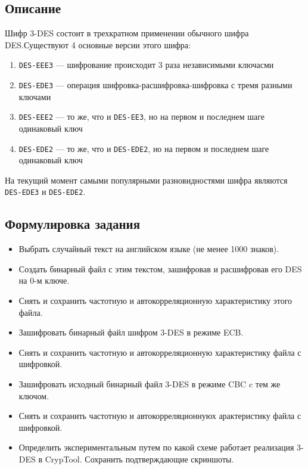 \documentclass[a4paper, 14pt]{extarticle}
\begin{document}
\subsection{Описание}
Шифр 3-DES состоит в трехкратном применении обычного шифра DES.\@ Существуют 4 основные версии этого шифра:
\begin{enumerate}
    \item \texttt{DES-EEE3} --- шифрование происходит 3 раза независимыми ключасми
    \item \texttt{DES-EDE3} --- операция шифровка-расшифровка-шифровка с тремя разными ключами
    \item \texttt{DES-EEE2} --- то же, что и \texttt{DES-EE3}, но на первом и последнем шаге одинаковый ключ
    \item \texttt{DES-EDE2} --- то же, что и \texttt{DES-EDE2}, но на первом и последнем шаге одинаковый ключ\\
\end{enumerate}
На текущий момент самыми популярными разновидностями шифра являются \texttt{DES-EDE3} и \texttt{DES-EDE2}.

\subsection{Формулировка задания}
\begin{itemize}
    \item Выбрать случайный текст на английском языке (не менее 1000 знаков).
    \item Создать бинарный файл с этим текстом, зашифровав и расшифровав его DES на 0-м ключе.
    \item Снять и сохранить частотную и автокорреляционную характеристику этого файла.
    \item Зашифровать бинарный файл шифром 3-DES в режиме ECB.\@
    \item Снять и сохранить частотную и автокорреляционную характеристику файла с шифровкой.
    \item Зашифровать исходный бинарный файл 3-DES в режиме CBC c тем же ключом.
    \item Снять и сохранить частотную и автокорреляционнуюх арактеристику файла с шифровкой.
    \item Определить экспериментальным путем по какой схеме работает
        реализация 3-DES в CrypTool. Сохранить подтверждающие скриншоты.
\end{itemize}
\end{document}
